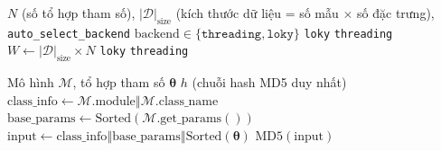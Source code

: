 \documentclass[12pt,a4paper]{article}
\begin{document}
\begin{algorithm}[H]
\caption{Lựa chọn backend thực thi tối ưu (\textsc{SelectOptimalBackend})}
\label{alg:gs_backend}
\begin{algorithmic}[1]
\Require $N$ (số tổ hợp tham số), $|\mathcal{D}|_{\text{size}}$ (kích thước dữ liệu = số mẫu $\times$ số đặc trưng), \texttt{auto\_select\_backend}
\Ensure $\text{backend} \in \{\texttt{threading}, \texttt{loky}\}$
    \State \Return \texttt{loky} 
\EndIf
{}
    \State \Return \texttt{threading} 
\EndIf
\State $W \gets |\mathcal{D}|_{\text{size}} \times N$ 
    \State \Return \texttt{loky} 
\EndIf
\State \Return \texttt{threading} 
\end{algorithmic}
\end{algorithm}

\begin{algorithm}[H]
\caption{Tạo khóa hash cho bộ nhớ đệm (\textsc{GetParamsHash})}
\label{alg:gs_hash}
\begin{algorithmic}[1]
\Require Mô hình $\mathcal{M}$, tổ hợp tham số $\boldsymbol{\theta}$
\Ensure $h$ (chuỗi hash MD5 duy nhất)
\State $\text{class\_info} \gets \mathcal{M}.\text{module} \mathbin{\Vert} \mathcal{M}.\text{class\_name}$
\State $\text{base\_params} \gets \text{Sorted}(\mathcal{M}.\text{get\_params}())$
\State $\text{input} \gets \text{class\_info} \mathbin{\Vert} \text{base\_params} \mathbin{\Vert} \text{Sorted}(\boldsymbol{\theta})$
\State \Return $\text{MD5}(\text{input})$
\end{algorithmic}
\end{algorithm}
\end{document}
